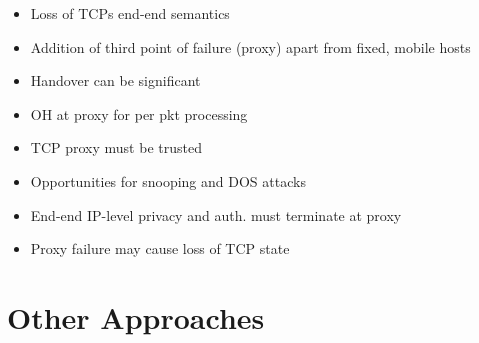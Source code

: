 \begin{itemize}
	\item Loss of TCPs end-end semantics
	\item Addition of third point of failure (proxy) apart from fixed,
		mobile hosts
	\item Handover can be significant
	\item OH at proxy for per pkt processing
	\item TCP proxy must be trusted
	\item Opportunities for snooping and DOS attacks
	\item End-end IP-level privacy and auth. must terminate at proxy
	\item Proxy failure may cause loss of TCP state
\end{itemize}
\section{Other Approaches}
